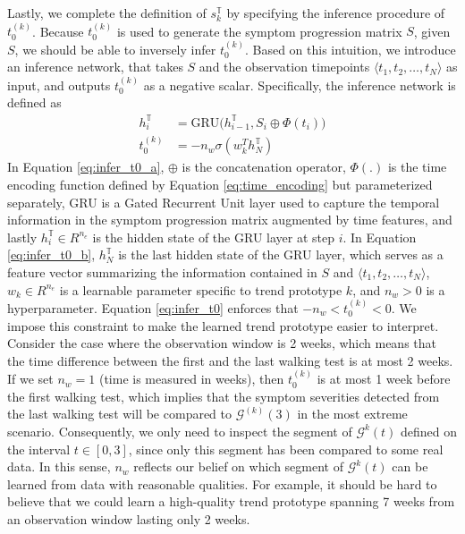 \documentclass[mnsc]{informs3b} %
\begin{document}
Lastly, we complete the definition of $s_k^{\mathbb{T}}$ by specifying the inference procedure of $t_0^{(k)}$. Because $t_0^{(k)}$ is used to generate the symptom progression matrix $S$, given $S$, we should be able to inversely infer $t_0^{(k)}$. 
Based on this intuition, we introduce an inference network, that takes $S$ and the observation timepoints $\langle t_1, t_2, \dots, t_{N} \rangle$ as input, and outputs $t_0^{(k)}$ as a negative scalar. Specifically, the inference network is defined as
\begin{subequations}
\label{eq:infer_t0}
\begin{align}
h_{i}^{\mathbb{T}} &= \text{GRU}\big(h_{i-1}^{\mathbb{T}}, S_{i} \oplus \Phi(t_i) \big) \label{eq:infer_t0_a} \\
t_0^{(k)} &= - n_w \sigma( w_{k}^T h_N^{\mathbb{T}} ) \label{eq:infer_t0_b}
\end{align}
\end{subequations}
In Equation \ref{eq:infer_t0_a}, $\oplus$ is the concatenation operator, $\Phi(.)$ is the time encoding function defined by Equation \ref{eq:time_encoding} but parameterized separately, GRU is a Gated Recurrent Unit layer \citep{cho_properties_2014} used to capture the temporal information in the symptom progression matrix augmented by time features, and lastly $h_i^{\mathbb{T}} \in R^{n_e}$ is the hidden state of the GRU layer at step $i$. In Equation \ref{eq:infer_t0_b}, $h_N^{\mathbb{T}}$ is the last hidden state of the GRU layer, which serves as a feature vector summarizing the information contained in $S$ and $\langle t_1, t_2, \dots, t_{N} \rangle$, $w_{k} \in R^{n_e}$ is a learnable parameter specific to trend prototype $k$, and $n_w>0$ is a hyperparameter. 
Equation \ref{eq:infer_t0} enforces that $-n_w < t_0^{(k)} < 0$. We impose this constraint to make the learned trend prototype easier to interpret. Consider the case where the observation window is 2 weeks, which means that the time difference between the first and the last walking test is at most 2 weeks. If we set $n_w=1$ (time is measured in weeks), then $t_0^{(k)}$ is at most 1 week before the first walking test, which implies that the symptom severities detected from the last walking test will be compared to $\mathcal{G}^{(k)}(3)$ in the most extreme scenario. Consequently, we only need to inspect the segment of $\mathcal{G}^{k}(t)$ defined on the interval $t \in [0, 3]$, since only this segment has been compared to some real data. In this sense, $n_w$ reflects our belief on which segment of $\mathcal{G}^{k}(t)$ can be learned from data with reasonable qualities. For example, it should be hard to believe that we could learn a high-quality trend prototype spanning 7 weeks from an observation window lasting only 2 weeks.
\end{document}
